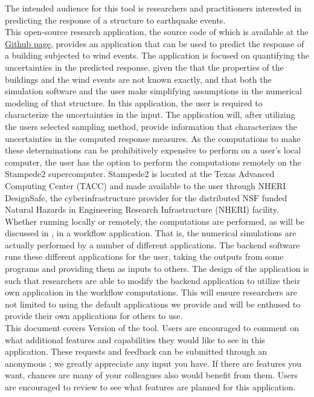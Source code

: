 The intended audience for this tool is researchers and practitioners
interested in predicting the response of a structure to earthquake
events.\\

This open-source research application, the source code of which is
available at
the \href{https://github.com/NHERI-SimCenter/EE-UQ}{\texttt{\getsoftwarename{}}
Github page}, provides an application that can be used to predict the
response of a building subjected to wind events. The application
is focused on quantifying the uncertainties in the predicted response,
given the that the properties of the buildings and the wind
events are not known exactly, and that both the simulation software
and the user make simplifying assumptions in the numerical modeling of
that structure. In this application, the user is required to
characterize the uncertainties in the input. The application will,
after utilizing the users selected sampling method, provide
information that characterizes the uncertainties in the computed
response measures. As the computations to make these determinations
can be prohibitively expensive to perform on a user's local computer,
the user has the option to perform the computations remotely on the
Stampede2 supercomputer. Stampede2 is located at the Texas Advanced
Computing Center (TACC) and made available to the user through NHERI
DesignSafe, the cyberinfrastructure provider for the distributed NSF
funded Natural Hazards in Engineering Research Infrastructure (NHERI)
facility.\\

Whether running locally or remotely, the computations are performed,
as will be discussed in , in a workflow
application. That is, the numerical simulations are actually performed
by a number of different applications. The \texttt{\getsoftwarename{}} backend software runs
these different applications for the user, taking the outputs from
some programs and providing them as inputs to others. The design of
the \texttt{\getsoftwarename{}} application is such that researchers are able to modify the
backend application to utilize their own application in the workflow
computations. This will ensure researchers are not limited to using
the default applications we provide and will be enthused to provide
their own applications for others to use. \\

This document covers Version \getsoftwareversion{} of the tool. Users are
encouraged to comment on what additional features and capabilities
they would like to see in this application. These requests and
feedback can be submitted through an anonymous ; we greatly appreciate any input you have. If there are
features you want, chances are many of your colleagues also would
benefit from them. Users are encouraged to review
 to see what features are planned for this
application.
